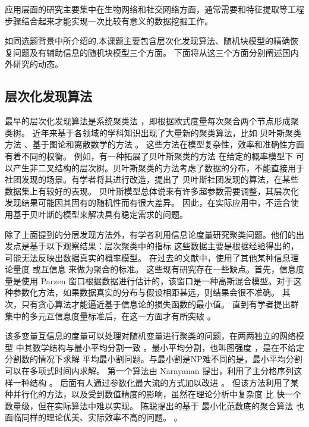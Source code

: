 应用层面的研究主要集中在生物网络和社交网络方面，通常需要和特征提取等工程步骤结合起来才能实现一次比较有意义的数据挖掘工作。

如同选题背景中所介绍的,本课题主要包含层次化发现算法、随机块模型的精确恢复问题及有辅助信息的随机块模型三个方面。
下面将从这三个方面分别阐述国内外研究的动态。
\subsection{层次化发现算法}

最早的层次化发现算法是系统聚类法 \cite{slink}，即根据欧式度量每次聚合两个节点形成聚类树。
近年来基于各领域的学科知识出现了大量新的聚类算法，比如
贝叶斯聚类方法 \cite{bhc}、基于图论和离散数学的方法 \cite{dasgupta2016cost}
。
这些方法在模型复杂性，效率和准确性方面有着不同的权衡。
例如，有一种拓展了贝叶斯聚类的方法 \cite{blundell2011discovering}
在给定的概率模型下
可以产生非二叉结构的层次树。贝叶斯聚类的方法考虑了数据的分布，不能直接用于社团发现的场景。有学者将其进行改造，提出了
贝叶斯社团发现的算法\cite{RN23}，在某些数据集上有较好的表现。
贝叶斯模型总体说来有许多超参数需要调整，其层次化发现结果可能因其固有的随机性而有很大差异。 因此，在实际应用中，不适合使用基于贝叶斯的模型来解决具有稳定需求的问题。 

除了上面提到的分层发现方法外，有学者利用信息论度量研究聚类问题。他们的出发点是基于以下观察结果：层次聚类中的指标
这些数据主要是根据经验得出的，可能无法反映出数据真实的概率模型。
在过去的文献中，使用了其他某种信息理论量度 \cite{ic2002} 或互信息\cite{mim}
来做为聚合的标准。
这些现有研究存在一些缺点。首先，信息度量是使用 Parzen 窗口根据数据进行估计的，该窗口是一种高斯混合模型。对于这种参数化方法，如果数据真实的分布与假设相距甚远，则结果会很不准确。
其次，只有贪心算法才能逼近基于信息论的损失函数的最小值。 
直到有学者提出群集中的多元互信息度量标准后，在这一方面才有所突破 \cite{ic2016}。 

该多变量互信息的度量可以处理对随机变量进行聚类的问题，在两两独立的网络模型 \cite{pin}
中其数学结构与最小平均分割一致  \cite{mac}。最小平均分割，也叫图强度 \cite{cunningham1985optimal}，是在不给定分割数的情况下求解
平均最小割问题。与最小割是NP难不同的是，最小平均分割可以在多项式时间内求解。
第一个算法由 Narayanan 提出，利用了主分格序列这样一种结构 \cite{narayanan}。
后面有人通过参数化最大流的方式加以改进 \cite{pic}。
但该方法利用了某种并行化的方法，以及受到数值精度的影响，虽然在理论分析中复杂度
比 \cite{narayanan} 快一个数量级，但在实际算法中难以实现。
陈聪提出的基于 最小化范数底的聚合算法 也面临同样的理论优美、实际效率不高的问题。 \cite{chan2020agglomerative}。

